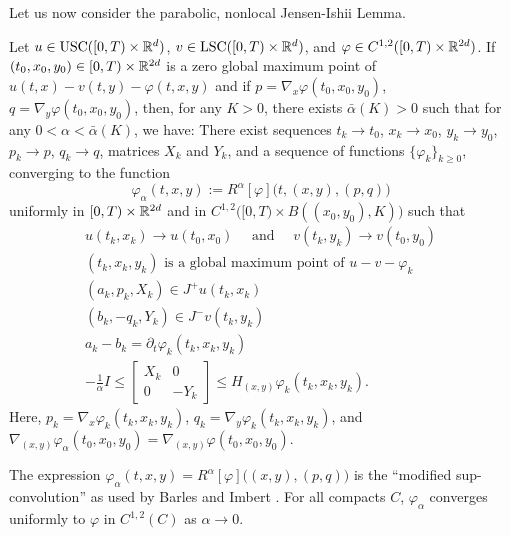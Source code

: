 Let us now consider the parabolic, nonlocal Jensen-Ishii Lemma. 
\begin{lemma}
\label{lemma: Parabolic, nonlocal Jensen-Ishii Lemma}
    Let $u \in \operatorname{USC}([0,T) \times \mathbb{R}^d)$, $v \in \operatorname{LSC}([0,T) \times \mathbb{R}^d)$, and $\varphi \in C^{1,2}([0,T) \times \mathbb{R}^{2d})$. If $(t_0,x_0,y_0) \in [0,T) \times \mathbb{R}^{2d}$ is a zero global maximum point of $u(t,x) - v(t,y) - \varphi(t,x,y)$ and if $p = \nabla_x \varphi(t_0,x_0,y_0)$, $q = \nabla_y \varphi(t_0,x_0,y_0)$, then, for any $K>0$, there exists $\bar \alpha (K) > 0$ such that for any $0 <\alpha < \bar \alpha (K)$, we have: There exist sequences $t_k \rightarrow t_0$, $x_k \rightarrow x_0$, $y_k \rightarrow y_0$, $p_k \rightarrow p$, $q_k \rightarrow q$, matrices $X_k$ and $Y_k$, and a sequence of functions $\{\varphi_k\}_{k \geq 0}$, converging to the function 
    \begin{equation*}
        \varphi_\alpha (t,x,y) := R^\alpha [\varphi] \big(t,(x,y),(p,q)\big)
    \end{equation*}
    uniformly in $[0,T) \times \mathbb{R}^{2d}$ and in $C^{1,2}\big([0,T) \times B((x_0,y_0),K)\big)$ such that 
    \begin{align}
        u(t_k,x_k) \rightarrow u(t_0,x_0) \quad \text{ and } \quad v(t_k,y_k) \rightarrow v(t_0,y_0) \label{eqn: (36) in Seydel} \\
        (t_k,x_k,y_k) \text{ is a global maximum point of } u-v-\varphi_k \label{eqn: (37) in Seydel} \\
        (a_k,p_k,X_k) \in J^+ u(t_k,x_k) \label{eqn: (38) in Seydel} \\
        (b_k,-q_k,Y_k) \in J^- v(t_k,y_k) \label{eqn: (39) in Seydel} \\
        a_k - b_k = \partial_t \varphi_k(t_k,x_k,y_k) \label{eqn: (39*) in Seydel} \\
        - \frac{1}{\alpha} I \leq 
            \begin{bmatrix}
            X_k & 0 \\
            0 & -Y_k 
            \end{bmatrix}
            \leq H_{(x,y)} \varphi_k (t_k,x_k,y_k). \label{eqn: (40) in Seydel}
    \end{align}
    Here, $p_k = \nabla_x \varphi_k(t_k,x_k,y_k)$, $q_k = \nabla_y \varphi_k (t_k,x_k,y_k)$, and \newline $\nabla_{(x,y)} \varphi_\alpha (t_0,x_0,y_0) = \nabla_{(x,y)} \varphi(t_0,x_0,y_0)$.
\end{lemma}
\begin{remark}
    The expression $\varphi_\alpha(t,x,y) = R^\alpha[\varphi]\big((x,y),(p,q)\big)$ is the ``modified sup-convolution'' as used by Barles and Imbert \cite{barles2008second}. For all compacts $C$, $\varphi_\alpha$ converges uniformly to $\varphi$ in $C^{1,2}(C)$ as $\alpha \rightarrow 0$.
\end{remark}
